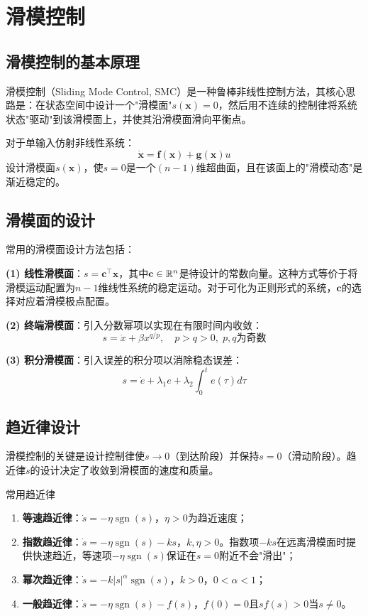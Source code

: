 \section{滑模控制}

\subsection{滑模控制的基本原理}

滑模控制（Sliding Mode Control, SMC）是一种鲁棒非线性控制方法，其核心思路是：在状态空间中设计一个"滑模面"$s(\mathbf{x}) = 0$，然后用不连续的控制律将系统状态"驱动"到该滑模面上，并使其沿滑模面滑向平衡点。

对于单输入仿射非线性系统：
\[
\dot{\mathbf{x}} = \mathbf{f}(\mathbf{x}) + \mathbf{g}(\mathbf{x})u
\]
设计滑模面$s(\mathbf{x})$，使$s = 0$是一个$(n-1)$维超曲面，且在该面上的"滑模动态"是渐近稳定的。

\subsection{滑模面的设计}

常用的滑模面设计方法包括：

\textbf{(1) 线性滑模面}：$s = \mathbf{c}^{\top}\mathbf{x}$，其中$\mathbf{c} \in \mathbb{R}^n$是待设计的常数向量。这种方式等价于将滑模运动配置为$n-1$维线性系统的稳定运动。对于可化为正则形式的系统，$\mathbf{c}$的选择对应着滑模极点配置。

\textbf{(2) 终端滑模面}：引入分数幂项以实现在有限时间内收敛：
\[
s = \dot{x} + \beta x^{q/p},\quad p > q > 0,\;p, q\text{为奇数}
\]

\textbf{(3) 积分滑模面}：引入误差的积分项以消除稳态误差：
\[
s = \dot{e} + \lambda_1 e + \lambda_2 \int_0^t e(\tau)d\tau
\]

\subsection{趋近律设计}

滑模控制的关键是设计控制律使$s \to 0$（到达阶段）并保持$s = 0$（滑动阶段）。趋近律$\dot{s}$的设计决定了收敛到滑模面的速度和质量。

\begin{mydefinition}{常用趋近律}
\begin{enumerate}
\item \textbf{等速趋近律}：$\dot{s} = -\eta\operatorname{sgn}(s)$，$\eta > 0$为趋近速度；
\item \textbf{指数趋近律}：$\dot{s} = -\eta\operatorname{sgn}(s) - ks$，$k, \eta > 0$。指数项$-ks$在远离滑模面时提供快速趋近，等速项$-\eta\operatorname{sgn}(s)$保证在$s=0$附近不会"滑出"；
\item \textbf{幂次趋近律}：$\dot{s} = -k|s|^{\alpha}\operatorname{sgn}(s)$，$k > 0$，$0 < \alpha < 1$；
\item \textbf{一般趋近律}：$\dot{s} = -\eta\operatorname{sgn}(s) - f(s)$，$f(0) = 0$且$sf(s) > 0$当$s \neq 0$。
\end{enumerate}
\end{mydefinition}

